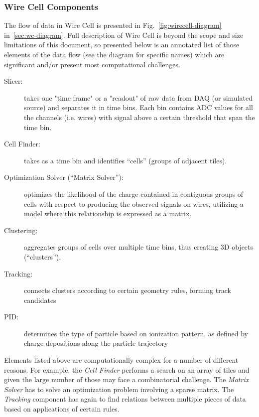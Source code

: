 \subsubsection{Wire Cell Components}
The flow of data in Wire Cell is presented in Fig.~\ref{fig:wirecell-diagram} in~\ref{sec:wc-diagram}.
Full description of Wire Cell is  beyond the scope and size limitations of this document,
so presented below is an annotated list of those elements of the data flow (see the diagram for specific
names) which are significant and/or present most computational challenges.
\begin{description}
\item[Slicer:] takes one "time frame" or a "readout" of raw data from DAQ (or simulated source)
and separates it in time bins.  Each bin contains ADC values for all the channels
(i.e. wires) with signal above a certain threshold that span the time bin.
	
\item[Cell Finder:] takes as a time bin and identifies ``cells'' (groups of adjacent tiles).
	
\item[Optimization Solver (``Matrix Solver''):] optimizes the likelihood of the charge contained in contiguous groups of cells
with respect to producing the observed signals on wires, utilizing a model where this relationship is expressed as a matrix.
	
\item[Clustering:] aggregates groups of cells over multiple time bins, thus creating 3D objects (``clusters'').
	
\item[Tracking:] connects clusters according to certain geometry rules, forming track candidates
	
\item[PID:] determines the type of particle based on ionization pattern, as defined by
charge depositions along the particle trajectory
\end{description}

\noindent
Elements listed above are computationally complex for a number of different reasons. For example,
the \textit{Cell Finder} performs a search on an array of tiles and given the large number
of those may face a combinatorial challenge. The \textit{Matrix Solver} has to solve an optimization
problem involving a sparse matrix. The \textit{Tracking} component has again to find relations
between multiple pieces of data based on applications of certain rules.
\newpage
